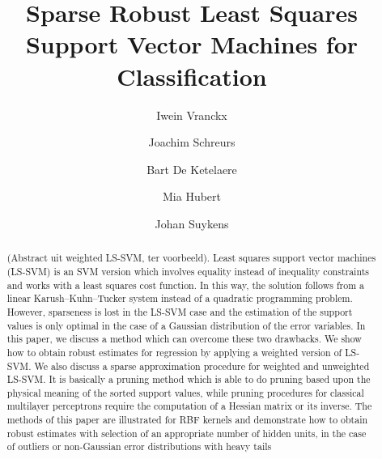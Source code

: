 \documentclass[preprint,12pt]{elsarticle}
\begin{document}
\begin{frontmatter}


\title{Sparse Robust Least Squares Support Vector Machines for Classification}





\author[statistics]{Iwein Vranckx}

\author[stadius]{Joachim Schreurs}
\author[mebios]{Bart De Ketelaere}
\author[statistics]{Mia Hubert}
\author[stadius]{Johan Suykens}
%
\address[statistics]{KU Leuven, Department of Mathematics and LStat, Celestijnenlaan 200B, BE-3001 Heverlee, Belgium}
\address[stadius]{KU Leuven, ESAT-STADIUS, Kasteelpark Arenberg 10, BE-3001 Heverlee, Belgium}
\address[mebios]{KU Leuven, Division of Mechatronics, Biostatistics and Sensors, Kasteelpark Arenberg 30, BE-3001 Heverlee, Belgium}

\begin{abstract}
(Abstract uit weighted LS-SVM, ter voorbeeld). Least squares support vector machines (LS-SVM) is an SVM version which involves
equality instead of inequality constraints and works with a least squares cost function.
In this way, the solution follows from a linear Karush–Kuhn–Tucker system instead of
a quadratic programming problem. However, sparseness is lost in the LS-SVM case and
the estimation of the support values is only optimal in the case of a Gaussian distribution
of the error variables. In this paper, we discuss a method which can overcome these two
drawbacks. We show how to obtain robust estimates for regression by applying a weighted
version of LS-SVM. We also discuss a sparse approximation procedure for weighted and
unweighted LS-SVM. It is basically a pruning method which is able to do pruning based
upon the physical meaning of the sorted support values, while pruning procedures for
classical multilayer perceptrons require the computation of a Hessian matrix or its inverse.
The methods of this paper are illustrated for RBF kernels and demonstrate how to obtain
robust estimates with selection of an appropriate number of hidden units, in the case of
outliers or non-Gaussian error distributions with heavy tails


\end{abstract}
\end{frontmatter}
\end{document}
